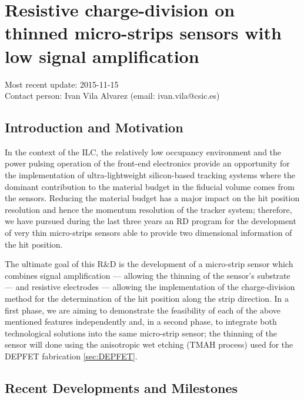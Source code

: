 \section{Resistive charge-division on thinned micro-strips sensors with low signal amplification}
Most recent update: 2015-11-15\\
Contact person: Ivan Vila Alvarez (email: ivan.vila@csic.es)
\subsection{Introduction and Motivation}

In the context of the ILC, the relatively low occupancy environment and the power pulsing operation of the front-end electronics provide an opportunity for the implementation of ultra-lightweight silicon-based tracking systems where the dominant contribution to the material budget in the fiducial volume comes from the sensors. Reducing the material budget has a major impact on the hit position resolution and hence the momentum resolution of the tracker system; therefore, we have pursued during the last three years an RD program for the development of very thin micro-strips sensors able to provide two dimensional information of the hit position.

The ultimate goal of this R\&D is the development of a micro-strip sensor which combines signal amplification --- allowing the thinning of the sensor’s substrate --- and resistive electrodes --- allowing the implementation of the charge-division method for the determination of the hit position along the strip direction. In a first phase, we are aiming to demonstrate the feasibility of each of the above mentioned features independently and, in a second phase, to integrate both technological solutions into the same micro-strip sensor; the thinning of the sensor will done using the anisotropic wet etching (TMAH process) used for the DEPFET fabrication \ref{sec:DEPFET}.

\subsection{Recent Developments and Milestones}

